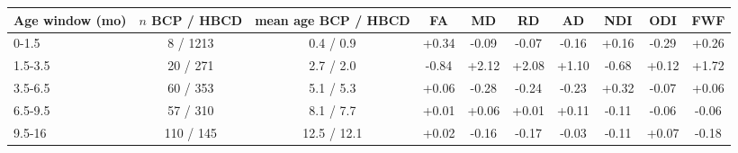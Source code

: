\begin{tabular}{lccccccccc}
\toprule
Age window (mo) & $n$ BCP / HBCD & mean age BCP / HBCD & FA & MD & RD & AD & NDI & ODI & FWF \\
\midrule
0-1.5 & 8 / 1213 & 0.4 / 0.9 & +0.34 & -0.09 & -0.07 & -0.16 & +0.16 & -0.29 & +0.26 \\
1.5-3.5 & 20 / 271 & 2.7 / 2.0 & -0.84 & +2.12 & +2.08 & +1.10 & -0.68 & +0.12 & +1.72 \\
3.5-6.5 & 60 / 353 & 5.1 / 5.3 & +0.06 & -0.28 & -0.24 & -0.23 & +0.32 & -0.07 & +0.06 \\
6.5-9.5 & 57 / 310 & 8.1 / 7.7 & +0.01 & +0.06 & +0.01 & +0.11 & -0.11 & -0.06 & -0.06 \\
9.5-16 & 110 / 145 & 12.5 / 12.1 & +0.02 & -0.16 & -0.17 & -0.03 & -0.11 & +0.07 & -0.18 \\
\bottomrule
\end{tabular}
